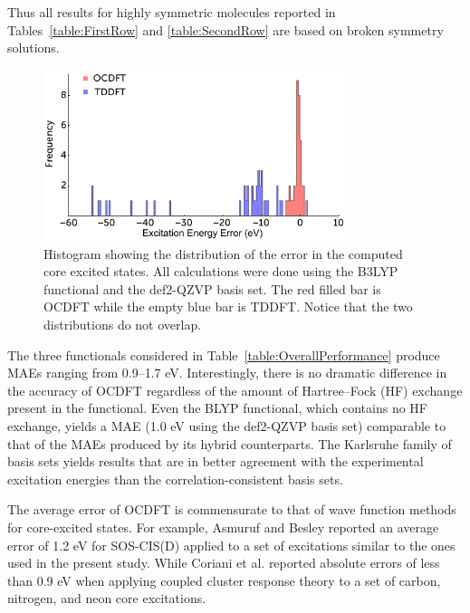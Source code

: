 \documentclass[8.5pt,twoside,twocolumn]{article}
\begin{document}
Thus all results for highly symmetric molecules reported in Tables~\ref{table:FirstRow} and \ref{table:SecondRow} are based on broken symmetry solutions.
\begin{figure}[!h]
\centering
\includegraphics[width=8.8cm]{NEW_histogram2.pdf}
\caption{Histogram showing the distribution of the error in the computed core excited states. All calculations were done using the B3LYP functional and the def2-QZVP basis set. The red filled bar is OCDFT while the empty blue bar is TDDFT. Notice that the two distributions do not overlap.}
\label{figure:Hist}
\end{figure}
The three functionals considered in Table~\ref{table:OverallPerformance} produce MAEs ranging from 0.9--1.7 eV. Interestingly, there is no dramatic difference in the accuracy of OCDFT regardless of the amount of Hartree--Fock (HF) exchange present in the functional. Even the BLYP functional, which contains no HF exchange, yields a MAE (1.0 eV using the def2-QZVP basis set) comparable to that of the MAEs produced by its hybrid counterparts.
The Karlsruhe family of basis sets yields results that are in better agreement with the experimental excitation energies than the correlation-consistent basis sets.

The average error of OCDFT is commensurate to that of wave function methods for core-excited states. For example, Asmuruf and Besley\cite{asmuruf_calculation_2008} reported an average error of 1.2 eV for SOS-CIS(D) applied to a set of excitations similar to the ones used in the present study. While Coriani et al.\cite{coriani_coupled-cluster_2012} reported absolute errors of less than 0.9 eV when applying coupled cluster response theory to a set of carbon, nitrogen, and neon core excitations. 
\end{document}
